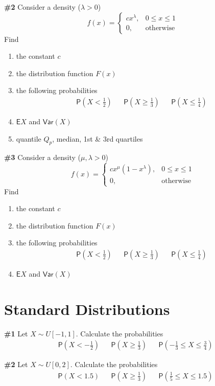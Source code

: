 \documentclass[12pt]{article}
\begin{document}
\noindent\textbf{\#2} Consider a density ($\lambda>0$)
\[
	f(x)=\begin{cases} 
	cx^\lambda, & 0\leq x\leq1 \\ 0, & \text{otherwise}
	\end{cases}
\]
Find
\begin{enumerate}
	\item the constant $c$
	\item the distribution function $F(x)$
	\item the following probabilities
	\begin{align*}
	&\mathsf{P}(X<\frac12) & &\mathsf{P}(X\geq\frac13) & &\mathsf{P}(X\leq\frac14)
	\end{align*}
	\item $\mathsf{E}X$ and $\mathsf{Var}(X)$
	\item quantile $Q_p$, median, 1st \& 3rd quartiles
\end{enumerate}

\noindent\textbf{\#3} Consider a density ($\mu,\lambda>0$)
\[
	f(x)=\begin{cases} 
	cx^\mu(1-x^\lambda), & 0\leq x\leq1 \\ 0, & \text{otherwise}
	\end{cases}
\]
Find
\begin{enumerate}
	\item the constant $c$
	\item the distribution function $F(x)$
	\item the following probabilities
	\begin{align*}
	&\mathsf{P}(X<\frac12) & &\mathsf{P}(X\geq\frac13) & &\mathsf{P}(X\leq\frac14)
	\end{align*}
	\item $\mathsf{E}X$ and $\mathsf{Var}(X)$
\end{enumerate}

\section{Standard Distributions}

\noindent\textbf{\#1} Let \(X\sim U[-1,1]\). Calculate the probabilities
\begin{align*}
	&\mathsf{P}(X<-\frac12) & &\mathsf{P}(X\geq\frac13) & &\mathsf{P}(-\frac13\leq X\leq\frac34)
\end{align*}

\noindent\textbf{\#2} Let \(X\sim U[0,2]\). Calculate the probabilities
\begin{align*}
	&\mathsf{P}(X<1.5) & &\mathsf{P}(X\geq\frac13) & &\mathsf{P}(\frac15\leq X\leq 1.5)
\end{align*}
\end{document}
